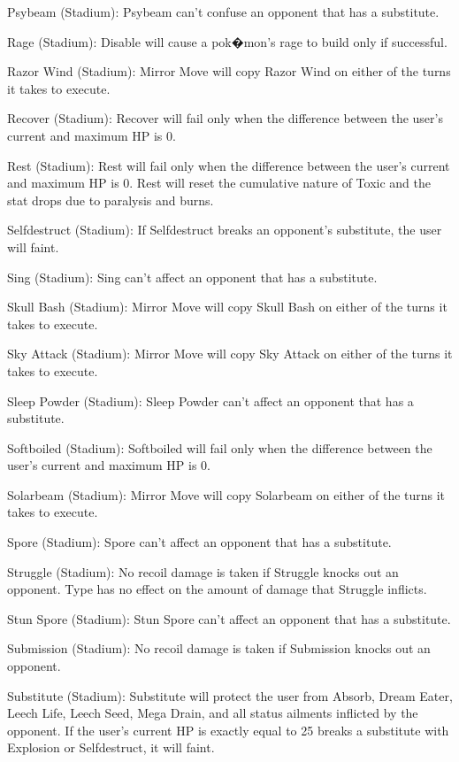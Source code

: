 \documentclass[reprint, aps, prl, paper=A4]{revtex4-1}
\begin{document}
Psybeam (Stadium):
Psybeam can't confuse an opponent that has a substitute.

Rage (Stadium):
Disable will cause a pok�mon's rage to build only if successful.

Razor Wind (Stadium):
Mirror Move will copy Razor Wind on either of the turns it takes to execute.

Recover (Stadium):
Recover will fail only when the difference between the user's current and maximum HP is 0.

Rest (Stadium):
Rest will fail only when the difference between the user's current and maximum HP is 0. Rest
will reset the cumulative nature of Toxic and the stat drops due to paralysis and burns.

Selfdestruct (Stadium):
If Selfdestruct breaks an opponent's substitute, the user will faint.

Sing (Stadium):
Sing can't affect an opponent that has a substitute.

Skull Bash (Stadium):
Mirror Move will copy Skull Bash on either of the turns it takes to execute.

Sky Attack (Stadium):
Mirror Move will copy Sky Attack on either of the turns it takes to execute.

Sleep Powder (Stadium):
Sleep Powder can't affect an opponent that has a substitute.

Softboiled (Stadium):
Softboiled will fail only when the difference between the user's current and maximum HP is 0.

Solarbeam (Stadium):
Mirror Move will copy Solarbeam on either of the turns it takes to execute.

Spore (Stadium):
Spore can't affect an opponent that has a substitute.

Struggle (Stadium):
No recoil damage is taken if Struggle knocks out an opponent. Type has no effect on the amount
of damage that Struggle inflicts.

Stun Spore (Stadium):
Stun Spore can't affect an opponent that has a substitute.

Submission (Stadium):
No recoil damage is taken if Submission knocks out an opponent.

Substitute (Stadium):
Substitute will protect the user from Absorb, Dream Eater, Leech Life, Leech Seed, Mega Drain,
and all status ailments inflicted by the opponent. If the user's current HP is exactly equal to
25%
breaks a substitute with Explosion or Selfdestruct, it will faint.
\end{document}

